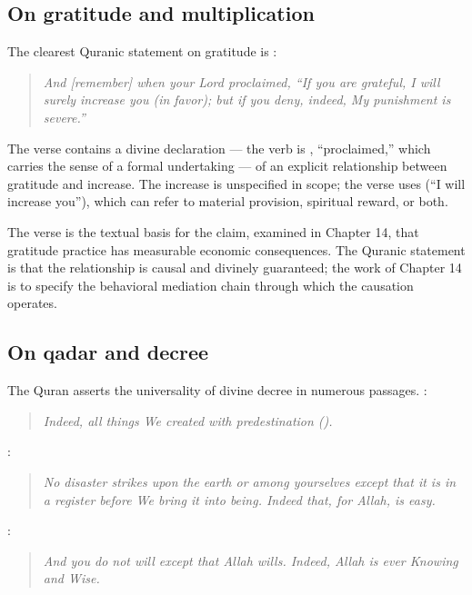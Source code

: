 \subsection{On gratitude and multiplication}

The clearest Quranic statement on gratitude is :

\begin{quote}
\textit{And [remember] when your Lord proclaimed, ``If you are
grateful, I will surely increase you (in favor); but if you deny,
indeed, My punishment is severe.''}
\end{quote}

The verse contains a divine declaration --- the verb is
, ``proclaimed,'' which carries the sense of a
formal undertaking --- of an explicit relationship between gratitude
and increase. The increase is unspecified in scope; the verse uses
 (``I will increase you''), which can refer to
material provision, spiritual reward, or both.

The verse is the textual basis for the claim, examined in Chapter
14, that gratitude practice has measurable economic consequences.
The Quranic statement is that the relationship is causal and
divinely guaranteed; the work of Chapter 14 is to specify the
behavioral mediation chain through which the causation operates.

\subsection{On qadar and decree}

The Quran asserts the universality of divine decree in numerous
passages. :

\begin{quote}
\textit{Indeed, all things We created with predestination
().}
\end{quote}

:

\begin{quote}
\textit{No disaster strikes upon the earth or among yourselves
except that it is in a register before We bring it into being.
Indeed that, for Allah, is easy.}
\end{quote}

:

\begin{quote}
\textit{And you do not will except that Allah wills. Indeed, Allah
is ever Knowing and Wise.}
\end{quote}

